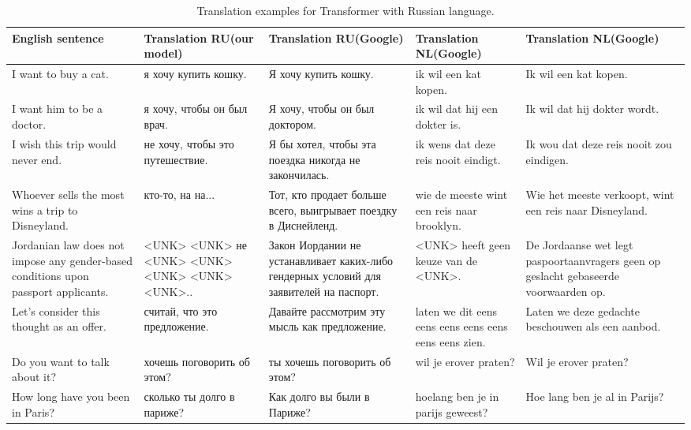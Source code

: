 \documentclass{article}
\begin{document}
\begin{table}
  \begin{center}
    \begin{tabular}{p{3.5cm}|p{3.5cm}|p{3.5cm}|p{3.5cm}|p{3.5cm}}
        \textbf{English sentence} & \textbf{Translation RU\newline (our model)} & \textbf{Translation RU\newline (Google)} & \textbf{Translation NL\newline (Google)} & \textbf{Translation NL\newline (Google)}\\
        \hline
        I want to buy a cat. 
        & я хочу купить кошку. 
        & Я хочу купить кошку. 
        & ik wil een kat kopen. 
        & Ik wil een kat kopen.\\
        \hline
        I want him to be a doctor. 
        & я хочу, чтобы он был врач. 
        & Я хочу, чтобы он был доктором. 
        & ik wil dat hij een dokter is. 
        & Ik wil dat hij dokter wordt.\\
        \hline
        I wish this trip would never end. 
        & не хочу, чтобы это путешествие. 
        & Я бы хотел, чтобы эта поездка никогда не закончилась. 
        & ik wens dat deze reis nooit eindigt. 
        & Ik wou dat deze reis nooit zou eindigen.\\
        \hline
        Whoever sells the most wins a trip to Disneyland. 
        & кто-то, на на... 
        & Тот, кто продает больше всего, выигрывает поездку в Диснейленд. 
        & wie de meeste wint een reis naar brooklyn. 
        & Wie het meeste verkoopt, wint een reis naar Disneyland.\\
        \hline
        Jordanian law does not impose any gender-based conditions upon passport applicants. 
        & <UNK> <UNK> не <UNK> <UNK> <UNK> <UNK> <UNK>.. 
        & Закон Иордании не устанавливает каких-либо гендерных условий для заявителей на паспорт. 
        & <UNK> heeft geen keuze van de <UNK>. 
        & De Jordaanse wet legt paspoortaanvragers geen op geslacht gebaseerde voorwaarden op.\\
        \hline
        Let's consider this thought as an offer. 
        & считай, что это предложение. 
        & Давайте рассмотрим эту мысль как предложение. 
        & laten we dit eens eens eens eens eens eens eens zien. 
        & Laten we deze gedachte beschouwen als een aanbod.\\
        \hline
        Do you want to talk about it? 
        & хочешь поговорить об этом? 
        & ты хочешь поговорить об этом? 
        & wil je erover praten? 
        & Wil je erover praten?\\
        \hline
        How long have you been in Paris? 
        & сколько ты долго в париже? 
        & Как долго вы были в Париже? 
        & hoelang ben je in parijs geweest? 
        & Hoe lang ben je al in Parijs?\\
    \end{tabular}
    \caption{Translation examples for Transformer with Russian language.}
    \label{tb:translation_tr_ru}
  \end{center}
\end{table}
\end{document}
